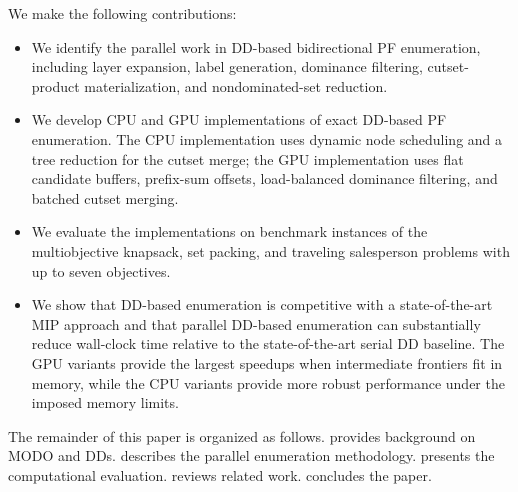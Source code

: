 We make the following contributions:
\begin{itemize}
    \item We identify the parallel work in DD-based bidirectional PF enumeration, including layer expansion, label generation, dominance filtering, cutset-product materialization, and nondominated-set reduction.
    \item We develop CPU and GPU implementations of exact DD-based PF enumeration. The CPU implementation uses dynamic node scheduling and a tree reduction for the cutset merge; the GPU implementation uses flat candidate buffers, prefix-sum offsets, load-balanced dominance filtering, and batched cutset merging.
    \item We evaluate the implementations on benchmark instances of the multiobjective knapsack, set packing, and traveling salesperson problems with up to seven objectives.
    \item We show that DD-based enumeration is competitive with a state-of-the-art MIP approach and that parallel DD-based enumeration can substantially reduce wall-clock time relative to the state-of-the-art serial DD baseline. The GPU variants provide the largest speedups when intermediate frontiers fit in memory, while the CPU variants provide more robust performance under the imposed memory limits.
\end{itemize}

The remainder of this paper is organized as follows.  provides background on MODO and DDs.  describes the parallel enumeration methodology.  presents the computational evaluation.  reviews related work.  concludes the paper.
